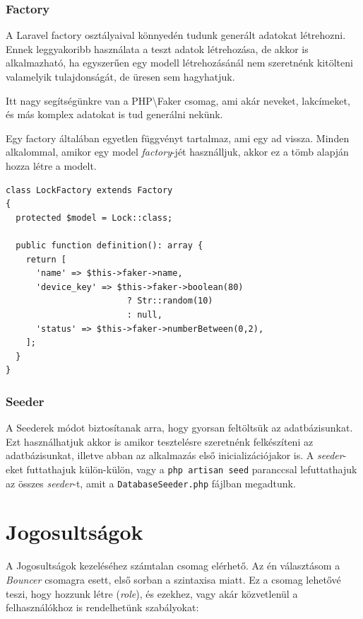 \documentclass[a4paper,12pt]{thesis-ekf}
\theoremstyle{definition}
\begin{document}
				\subsubsection{Factory}\label{sssc-db_factory}
					A Laravel factory osztályaival könnyedén tudunk generált adatokat létrehozni. Ennek leggyakoribb használata a teszt adatok létrehozása, de akkor is alkalmazható, ha egyszerűen egy modell létrehozásánál nem szeretnénk kitölteni valamelyik tulajdonságát, de üresen sem hagyhatjuk.
					
					Itt nagy segítségünkre van a PHP\textbackslash{}Faker csomag, ami akár neveket, lakcímeket, és más komplex adatokat is tud generálni nekünk.
					
					Egy factory általában egyetlen függvényt tartalmaz, ami egy  ad vissza. Minden alkalommal, amikor egy model \emph{factory}-jét használljuk, akkor ez a tömb alapján hozza létre a modelt.
					
					\begin{lstlisting}[caption={P\'elda Factory (LockFactory.php)},captionpos=b]
class LockFactory extends Factory
{
  protected $model = Lock::class;

  public function definition(): array {
    return [
      'name' => $this->faker->name,
      'device_key' => $this->faker->boolean(80) 
                        ? Str::random(10) 
                        : null,
      'status' => $this->faker->numberBetween(0,2),
    ];
  }
}
					\end{lstlisting}
					
				\subsubsection{Seeder}\label{sssc-db_seeder}
					A Seederek módot biztosítanak arra, hogy gyorsan feltöltsük az adatbázisunkat. Ezt használhatjuk akkor is amikor tesztelésre szeretnénk felkészíteni az adatbázisunkat, illetve abban az alkalmazás első inicializációjakor is. A \emph{seeder}-eket futtathajuk külön-külön, vagy a \verb|php artisan seed| paranccsal lefuttathajuk az összes \emph{seeder}-t, amit a \verb|DatabaseSeeder.php| fájlban megadtunk.
					
		\section{Jogosultságok}
			A Jogosultságok kezeléséhez számtalan csomag elérhető. Az én választásom a \emph{Bouncer} csomagra esett, első sorban a szintaxisa miatt. Ez a csomag lehetővé teszi, hogy  hozzunk létre (\emph{role}), és ezekhez, vagy akár közvetlenül a felhasználókhoz is rendelhetünk szabályokat:
			
\end{document}
